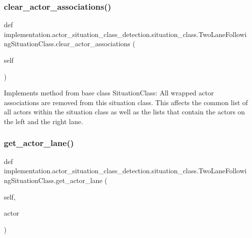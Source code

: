 \subsubsection{\texorpdfstring{clear\+\_\+actor\+\_\+associations()}{clear\_actor\_associations()}}
{\footnotesize\ttfamily def implementation.\+actor\+\_\+situation\+\_\+class\+\_\+detection.\+situation\+\_\+class.\+Two\+Lane\+Following\+Situation\+Class.\+clear\+\_\+actor\+\_\+associations (\begin{DoxyParamCaption}\item[{}]{self }\end{DoxyParamCaption})}

\begin{DoxyVerb}Implements method from base class SituationClass: All wrapped actor associations are removed from this
situation class. This affects the common list of all actors within the situation class as well as the
lists that contain the actors on the left and the right lane.
\end{DoxyVerb}
 \mbox{\label{classimplementation_1_1actor__situation__class__detection_1_1situation__class_1_1_two_lane_following_situation_class_ad7e7971b4f64c6afa2cc1c3cf65ab376}} 
\subsubsection{\texorpdfstring{get\+\_\+actor\+\_\+lane()}{get\_actor\_lane()}}
{\footnotesize\ttfamily def implementation.\+actor\+\_\+situation\+\_\+class\+\_\+detection.\+situation\+\_\+class.\+Two\+Lane\+Following\+Situation\+Class.\+get\+\_\+actor\+\_\+lane (\begin{DoxyParamCaption}\item[{}]{self,  }\item[{}]{actor }\end{DoxyParamCaption})}

